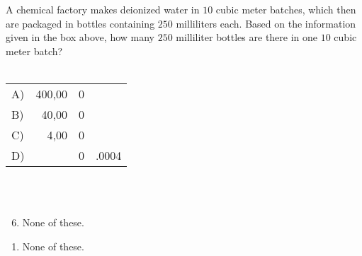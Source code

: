  
\begin{center}
\end{center}
A chemical factory makes deionized water in $10$ cubic meter batches, which then are packaged in bottles containing $250$ milliliters each.  Based on the information given in the box above, how many $250$ milliliter bottles are there in one $10$ cubic meter batch?\\ \\
\begin{tabular}{lrcl}
A)\hspace{3mm}& 400,00&\hspace{-4mm}0& \\
B)\hspace{3mm}& 40,00&\hspace{-4mm}0&\\
C)\hspace{3mm}& 4,00&\hspace{-4mm}0&\\
D)\hspace{3mm}&&\hspace{-4mm}0&\hspace{-4mm}.0004\\
\end{tabular}\\ \\


\ifsat
	\begin{enumerate}[label=\Alph*)]
	\end{enumerate}
\else
\fi

\ifacteven
	\begin{enumerate}[label=\textbf{\Alph*.},itemsep=\fill,align=left]
		\setcounter{enumii}{5}
		\item None of these. 
	\end{enumerate}
\else
\fi

\ifactodd
	\begin{enumerate}[label=\textbf{\Alph*.},itemsep=\fill,align=left]
		\item None of these. 
	\end{enumerate}
\else
\fi

\ifgridin
\else
\fi

